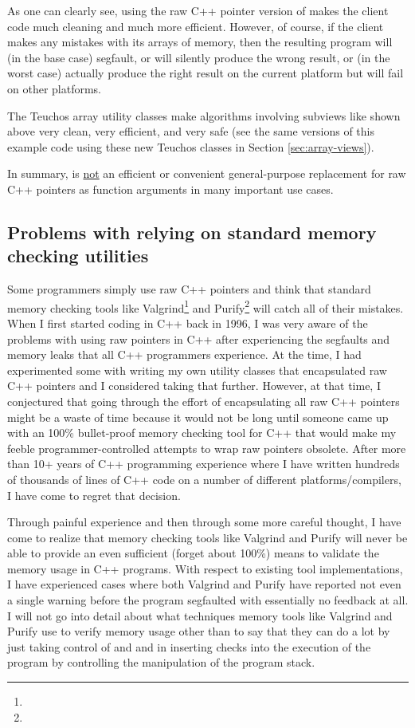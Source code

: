 \documentclass[pdf,ps2pdf,11pt]{SANDreport}
\begin{document}
As one can clearly see, using the raw C++ pointer version of
{} makes the client code much cleaning and
much more efficient.  However, of course, if the client makes any
mistakes with its arrays of memory, then the resulting program will
(in the base case) segfault, or will silently produce the wrong
result, or (in the worst case) actually produce the right result on
the current platform but will fail on other platforms.

The Teuchos array utility classes make algorithms involving subviews
like shown above very clean, very efficient, and very safe (see the
same versions of this example code using these new Teuchos classes in
Section {}\ref{sec:array-views}).

In summary, {} is {}\underline{not} an efficient
or convenient general-purpose replacement for raw C++ pointers as
function arguments in many important use cases.


%
{}\subsection{Problems with relying on standard memory checking
utilities}
\label{sec:problems-with-mem-checkers}
%

Some programmers simply use raw C++ pointers and think that standard
memory checking tools like
Valgrind\footnote{{}} and
Purify\footnote{}
will catch all of their mistakes.  When I first started coding in C++
back in 1996, I was very aware of the problems with using raw pointers
in C++ after experiencing the segfaults and memory leaks that all C++
programmers experience.  At the time, I had experimented some with
writing my own utility classes that encapsulated raw C++ pointers and
I considered taking that further.  However, at that time, I
conjectured that going through the effort of encapsulating all raw C++
pointers might be a waste of time because it would not be long until
someone came up with an 100\% bullet-proof memory checking tool for
C++ that would make my feeble programmer-controlled attempts to wrap
raw pointers obsolete.  After more than 10+ years of C++ programming
experience where I have written hundreds of thousands of lines of C++
code on a number of different platforms/compilers, I have come to
regret that decision.

Through painful experience and then through some more careful thought,
I have come to realize that memory checking tools like Valgrind and
Purify will never be able to provide an even sufficient (forget about
100\%) means to validate the memory usage in C++ programs.  With
respect to existing tool implementations, I have experienced cases
where both Valgrind and Purify have reported not even a single warning
before the program segfaulted with essentially no feedback at all.  I
will not go into detail about what techniques memory tools like
Valgrind and Purify use to verify memory usage other than to say that
they can do a lot by just taking control of {} and
{} and in inserting checks into the execution of the
program by controlling the manipulation of the program stack.
\end{document}
